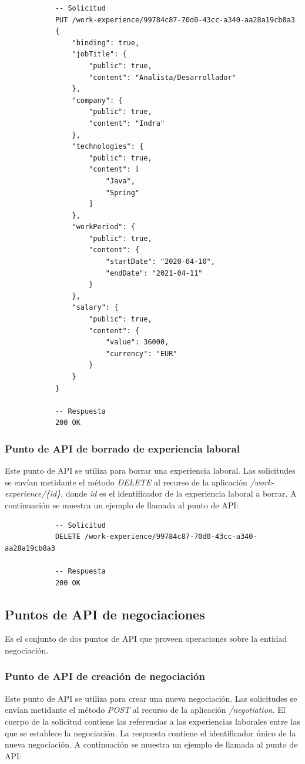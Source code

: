 \documentclass[a4paper, 12pt]{book}
\begin{document}
			{\footnotesize
			\begin{verbatim}
			-- Solicitud
			PUT /work-experience/99784c87-70d0-43cc-a340-aa28a19cb8a3
			{
			    "binding": true,
			    "jobTitle": {
			        "public": true,
			        "content": "Analista/Desarrollador"
			    },
			    "company": {
			        "public": true,
			        "content": "Indra"
			    },
			    "technologies": {
			        "public": true,
			        "content": [
			            "Java",
			            "Spring"
			        ]
			    },
			    "workPeriod": {
			        "public": true,
			        "content": {
			            "startDate": "2020-04-10",
			            "endDate": "2021-04-11"
			        }
			    },
			    "salary": {
			        "public": true,
			        "content": {
			            "value": 36000,
			            "currency": "EUR"
			        }
			    }
			}

			-- Respuesta
			200 OK
			\end{verbatim}
			}

\subsubsection{Punto de API de borrado de experiencia laboral}
\label{subsec:delete_work_experience}
Este punto de API se utiliza para borrar una experiencia laboral.
Las solicitudes se envían metidante el método \emph{DELETE} al recurso de la aplicación \emph{/work-experience/\{id\}}, donde \emph{id} es el identificador de la experiencia laboral a borrar.
A continuación se muestra un ejemplo de llamada al punto de API:

			{\footnotesize
			\begin{verbatim}
			-- Solicitud
			DELETE /work-experience/99784c87-70d0-43cc-a340-aa28a19cb8a3

			-- Respuesta
			200 OK
			\end{verbatim}
			}

\subsection{Puntos de API de negociaciones}
\label{subsec:negotiation_endpoints}
Es el conjunto de dos puntos de API que proveen operaciones sobre la entidad negociación.

\subsubsection{Punto de API de creación de negociación}
\label{subsec:post_work_experience}
Este punto de API se utiliza para crear una nueva negociación.
Las solicitudes se envían metidante el método \emph{POST} al recurso de la aplicación \emph{/negotiation}.
El cuerpo de la solicitud contiene las referencias a las experiencias laborales entre las que se establece la negociación.
La respuesta contiene el identificador único de la nueva negociación.
A continuación se muestra un ejemplo de llamada al punto de API:
\end{document}
